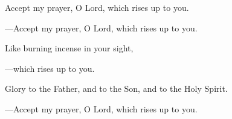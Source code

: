 \responsory
\begin{hangpar}

Accept my prayer, O Lord, which rises up to you.

{\color{red}---\thinspace}Accept my prayer, O Lord, which rises up to you.

\medskip Like burning incense in your sight,

{\color{red}---\thinspace}which rises up to you.

\medskip Glory to the Father, and to the Son, and to the Holy Spirit.

{\color{red}---\thinspace}Accept my prayer, O Lord, which rises up to you.
\end{hangpar}
